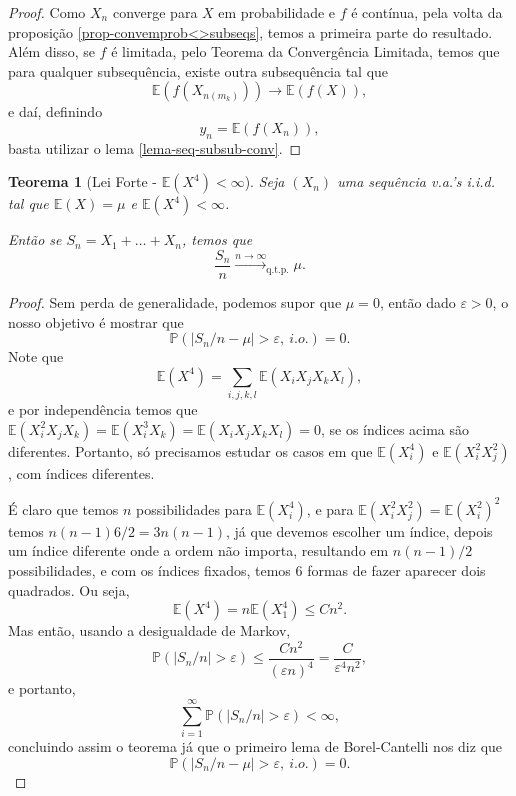 \documentclass[12pt,a4paper,oneside]{book}
\newtheorem{theorem}{Teorema}[section]
\theoremstyle{definition}
\theoremstyle{remark}
\numberwithin{equation}{section}
\newcommand{\e}{\varepsilon}
\newcommand{\E}{\mathbb{E}}
\newcommand{\pr}{\mathbb{P}}
\newcommand{\rarrowlimn}{\xrightarrow{n\rightarrow \infty}}
\begin{document}
\begin{proof}
Como $X_n$ converge para $X$ em probabilidade e $f$ é contínua, pela volta da proposição \ref{prop-convemprob<>subseqs}, temos a primeira parte do resultado.
Além disso, se $f$ é limitada, pelo Teorema da Convergência Limitada, temos que para qualquer subsequência, existe outra subsequência tal que 
$$\E(f(X_{n(m_k)}))\rightarrow \E(f(X)), $$
e daí, definindo
$$y_n = \E(f(X_n)), $$
basta utilizar o lema \ref{lema-seq-subsub-conv}.
\end{proof}


\begin{tcolorbox}

\begin{theorem}[Lei Forte - $\E(X^4)<\infty$] Seja $(X_n)$ uma sequência v.a.'s i.i.d. tal que $\E(X)=\mu$ e $\E(X^4)<\infty$. 

Então se $S_n= X_1+\dots+X_n$, temos que
$$\dfrac{S_n}{n}\rarrowlimn_{\textrm{q.t.p.}} \mu. $$
\end{theorem}

\end{tcolorbox}

\begin{proof}
Sem perda de generalidade, podemos supor que $\mu = 0$, então  dado $\e>0$, o nosso objetivo é mostrar que
$$\pr(|S_n/n - \mu|>\e,\ i.o.)=0. $$
Note que 
$$\E(X^4)=\sum_{i,j,k,l}\E( X_iX_jX_kX_l),$$
e por independência temos que $ \E(X_i^2X_jX_k) = \E(X_i^3X_k)=\E( X_iX_jX_kX_l) =0$, se os índices acima são diferentes. Portanto, só precisamos estudar os casos em que 
$\E(X_i^4)$ e $\E(X_i^2X_j^2)$, com índices diferentes. 

É claro que temos $n$ possibilidades para $\E(X_i^4)$, e para $\E(X_i^2X_j^2) = \E(X_i^2)^2$ temos $n(n-1)6/2 = 3n(n-1)$, já que devemos escolher um índice, depois um índice diferente onde a ordem não importa, resultando em $n(n-1)/2$ possibilidades, e com os índices fixados, temos 6 formas de fazer aparecer dois quadrados. Ou seja,
$$\E(X^4) = n\E(X_1^4)  \leq Cn^2. $$
Mas então, usando a desigualdade de Markov,
$$\pr(|S_n/n|>\e)\leq \dfrac{Cn^2}{(\e n)^4} = \dfrac{C}{\e^4n^2}, $$
e portanto,
$$\sum_{i=1}^\infty \pr(|S_n/n|>\e) < \infty, $$
concluindo assim o teorema já que o primeiro lema de Borel-Cantelli nos diz que 
$$\pr(|S_n/n - \mu|>\e,\ i.o.)=0. $$
\end{proof}
\end{document}
